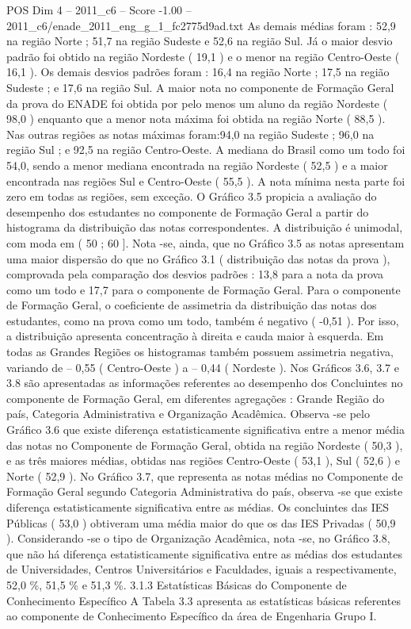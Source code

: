 \begin{textsample}{POS Dim 4 – 2011\_c6 – Score -1.00 – 2011\_c6/enade\_2011\_eng\_g\_1\_fc2775d9ad.txt}
As demais médias foram : 52,9 na região Norte ; 51,7 na região Sudeste e 52,6 na região Sul.
Já o maior desvio padrão foi obtido na região Nordeste ( 19,1 ) e o menor na região Centro-Oeste ( 16,1 ).
Os demais desvios padrões foram : 16,4 na região Norte ; 17,5 na região Sudeste ; e 17,6 na região Sul.
A maior nota no componente de Formação Geral da prova do ENADE foi obtida por pelo menos um aluno da região Nordeste ( 98,0 ) enquanto que a menor nota máxima foi obtida na região Norte ( 88,5 ).
Nas outras regiões as notas máximas foram:94,0 na região Sudeste ; 96,0 na região Sul ; e 92,5 na região Centro-Oeste.
A mediana do Brasil como um todo foi 54,0, sendo a menor mediana encontrada na região Nordeste ( 52,5 ) e a maior encontrada nas regiões Sul e Centro-Oeste ( 55,5 ).
A nota mínima nesta parte foi zero em todas as regiões, sem exceção.
O Gráfico 3.5 propicia a avaliação do desempenho dos estudantes no componente de Formação Geral a partir do histograma da distribuição das notas correspondentes.
A distribuição é unimodal, com moda em ( 50 ; 60 ].
Nota -se, ainda, que no Gráfico 3.5 as notas apresentam uma maior dispersão do que no Gráfico 3.1 ( distribuição das notas da prova ), comprovada pela comparação dos desvios padrões : 13,8 para a nota da prova como um todo e 17,7 para o componente de Formação Geral.
Para o componente de Formação Geral, o coeficiente de assimetria da distribuição das notas dos estudantes, como na prova como um todo, também é negativo ( -0,51 ).
Por isso, a distribuição apresenta concentração à direita e cauda maior à esquerda.
Em todas as Grandes Regiões os histogramas também possuem assimetria negativa, variando de – 0,55 ( Centro-Oeste ) a – 0,44 ( Nordeste ).
Nos Gráficos 3.6, 3.7 e 3.8 são apresentadas as informações referentes ao desempenho dos Concluintes no componente de Formação Geral, em diferentes agregações : Grande Região do país, Categoria Administrativa e Organização Acadêmica.
Observa -se pelo Gráfico 3.6 que existe diferença estatisticamente significativa entre a menor média das notas no Componente de Formação Geral, obtida na região Nordeste ( 50,3 ), e as três maiores médias, obtidas nas regiões Centro-Oeste ( 53,1 ), Sul ( 52,6 ) e Norte ( 52,9 ).
No Gráfico 3.7, que representa as notas médias no Componente de Formação Geral segundo Categoria Administrativa do país, observa -se que existe diferença estatisticamente significativa entre as médias.
Os concluintes das IES Públicas ( 53,0 ) obtiveram uma média maior do que os das IES Privadas ( 50,9 ).
Considerando -se o tipo de Organização Acadêmica, nota -se, no Gráfico 3.8, que não há diferença estatisticamente significativa entre as médias dos estudantes de Universidades, Centros Universitários e Faculdades, iguais a respectivamente, 52,0 \%, 51,5 \% e 51,3 \%. 3.1.3 Estatísticas Básicas do Componente de Conhecimento Específico A Tabela 3.3 apresenta as estatísticas básicas referentes ao componente de Conhecimento Específico da área de Engenharia Grupo I.

\end{textsample}

